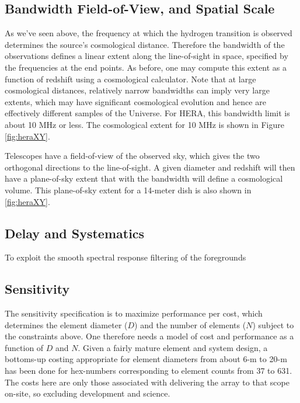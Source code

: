 \documentclass[ars]{/Users/daviddeboer1/Documents/Papers/Copernicus_LaTeX_Package_v_2_7/copernicus}
\begin{document}
\subsection{Bandwidth Field-of-View, and Spatial Scale}
As we've seen above, the frequency at which the hydrogen transition is observed
determines the source's cosmological distance. Therefore the bandwidth of the
observations defines a linear extent along the line-of-sight in space, specified by
the frequencies at the end points. As before, one may compute this extent as a
function of redshift using a cosmological calculator. Note that at large cosmological
distances, relatively narrow bandwidths can imply very large extents, which may have
significant cosmological evolution and hence are effectively different samples of the
Universe. For HERA, this bandwidth limit is about 10 MHz or less. The cosmological
extent for 10 MHz is shown in Figure \ref{fig:heraXY}.

Telescopes have a field-of-view of the observed sky, which gives the two orthogonal
directions to the line-of-sight. A given diameter and redshift will then have a
plane-of-sky extent that with the bandwidth will define a cosmological volume. This
plane-of-sky extent for a 14-meter dish is also shown in \ref{fig:heraXY}.

\subsection{Delay and Systematics}
To exploit the smooth spectral response filtering of the foregrounds


\subsection{Sensitivity}
The sensitivity specification is to maximize performance per cost, which determines the element 
diameter ($D$) and the number of elements ($N$) subject to the constraints above.  One therefore 
needs a model of cost and performance as a function of $D$ and $N$.  Given a fairly mature element
and system design, a bottoms-up costing appropriate for element diameters from about 6-m to 20-m 
has been done for hex-numbers corresponding to element counts from 37 to 631.  The costs here
are only those associated with delivering the array to that scope on-site, so excluding development and
science.
\end{document}
